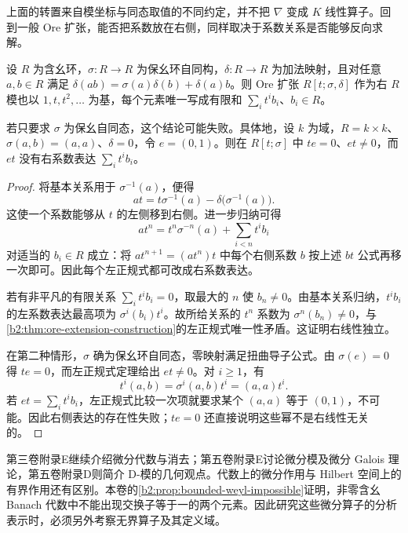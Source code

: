 上面的转置来自模坐标与同态取值的不同约定，并不把 \(\nabla\) 变成 \(K\) 线性算子。回到一般 Ore 扩张，能否把系数放在右侧，同样取决于系数关系是否能够反向求解。

\begin{proposition}\label{b2:prop:ore-right-normal-form}
	设 \(R\) 为含幺环，\(\sigma:R\to R\) 为保幺环自同构，\(\delta:R\to R\) 为加法映射，且对任意 \(a,b\in R\) 满足 \(\delta(ab)=\sigma(a)\delta(b)+\delta(a)b\)。则 Ore 扩张 \(R[t;\sigma,\delta]\) 作为右 \(R\) 模也以 \(1,t,t^2,\ldots\) 为基，每个元素唯一写成有限和 \(\sum_i t^ib_i\)、\(b_i\in R\)。

	若只要求 \(\sigma\) 为保幺自同态，这个结论可能失败。具体地，设 \(k\) 为域，\(R=k\times k\)、\(\sigma(a,b)=(a,a)\)、\(\delta=0\)，令 \(e=(0,1)\)。则在 \(R[t;\sigma]\) 中 \(te=0\)、\(et\ne0\)，而 \(et\) 没有右系数表达 \(\sum_i t^ib_i\)。
\end{proposition}
\begin{proof}
	将基本关系用于 \(\sigma^{-1}(a)\)，便得
	\[
		at=t\sigma^{-1}(a)-\delta\bigl(\sigma^{-1}(a)\bigr).
	\]
	这使一个系数能够从 \(t\) 的左侧移到右侧。进一步归纳可得
	\[
		at^n=t^n\sigma^{-n}(a)+\sum_{i<n}t^ib_i
	\]
	对适当的 \(b_i\in R\) 成立：将 \(at^{n+1}=(at^n)t\) 中每个右侧系数 \(b\) 按上述 \(bt\) 公式再移一次即可。因此每个左正规式都可改成右系数表达。

	若有非平凡的有限关系 \(\sum_i t^ib_i=0\)，取最大的 \(n\) 使 \(b_n\ne0\)。由基本关系归纳，\(t^ib_i\) 的左系数表达最高项为 \(\sigma^i(b_i)t^i\)。故所给关系的 \(t^n\) 系数为 \(\sigma^n(b_n)\ne0\)，与\cref{b2:thm:ore-extension-construction}的左正规式唯一性矛盾。这证明右线性独立。

	在第二种情形，\(\sigma\) 确为保幺环自同态，零映射满足扭曲导子公式。由 \(\sigma(e)=0\) 得 \(te=0\)，而左正规式定理给出 \(et\ne0\)。对 \(i\ge1\)，有
	\[
		t^i(a,b)=\sigma^i(a,b)t^i=(a,a)t^i.
	\]
	若 \(et=\sum_i t^ib_i\)，左正规式比较一次项就要求某个 \((a,a)\) 等于 \((0,1)\)，不可能。因此右侧表达的存在性失败；\(te=0\) 还直接说明这些幂不是右线性无关的。
\end{proof}

第三卷附录E继续介绍微分代数与消去；第五卷附录E讨论微分模及微分 Galois 理论，第五卷附录D则简介 D-模的几何观点。代数上的微分作用与 Hilbert 空间上的有界作用还有区别。本卷的\cref{b2:prop:bounded-weyl-impossible}证明，非零含幺 Banach 代数中不能出现交换子等于一的两个元素。因此研究这些微分算子的分析表示时，必须另外考察无界算子及其定义域。
